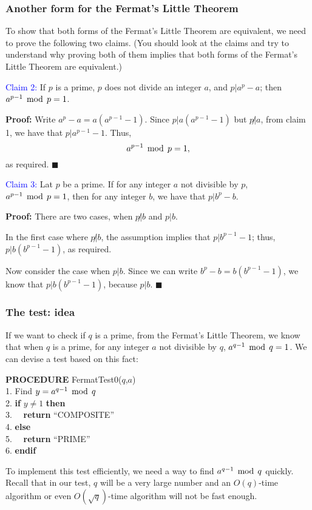 \begin{frame}\frametitle{Another form for the Fermat's Little Theorem}
  To show that both forms of the Fermat's Little Theorem are
  equivalent, we need to prove the following two claims.  (You should
  look at the claims and try to understand why proving both of them
  implies that both forms of the Fermat's Little Theorem are
  equivalent.)

  \begin{tcolorbox}[title=Second form $\Rightarrow$ first form]
    \textcolor{blue}{Claim 2:} If $p$ is a prime, $p$ does not divide an integer $a$, and $p|a^p-a$; then $a^{p-1}\,\bmod\, p = 1$.
  \end{tcolorbox}

  {\bf Proof:} Write $a^p-a = a(a^{p-1}-1)$.  Since $p|a(a^{p-1}-1)$
  but $p\not|a$, from claim 1, we have that $p|a^{p-1}-1$.  Thus, 
  \[ a^{p-1}\,\bmod\, p = 1, \]
  as required. $\blacksquare$
\end{frame}

\begin{frame} 
  \begin{tcolorbox}[title=First form $\Rightarrow$ second form]
    \textcolor{blue}{Claim 3:} Lat $p$ be a prime.  If for any integer
    $a$ not divisible by $p$, $a^{p-1}\,\bmod\, p = 1$, then for any
    integer $b$, we have that $p|b^p-b$.
  \end{tcolorbox}
  
  {\bf Proof:} There are two cases, when $p\not|b$ and $p|b$.  

  In the first case where $p\not|b$, the assumption implies that
  $p|b^{p-1}-1$; thus, $p|b(b^{p-1}-1)$, as required.

  Now consider the case when $p|b$.  Since we can write
  $b^p-b=b(b^{p-1}-1)$, we know that $p|b(b^{p-1}-1)$, because
  $p|b$. $\blacksquare$
\end{frame}

\begin{frame}\frametitle{The test: idea}
  If we want to check if $q$ is a prime, from the Fermat's Little
  Theorem, we know that when $q$ is a prime, for any integer $a$ not
  divisible by $q$, $a^{q-1}\,\bmod\, q=1$.  We can devise a test based on
  this fact:

  \begin{tcolorbox}
    {\bf PROCEDURE} FermatTest0($q$,$a$)\\
    1. Find $y = a^{q-1}\,\bmod\, q$\\
    2. {\bf if} $y\neq 1$ {\bf then}\\
    3. \ \ {\bf return} ``COMPOSITE''\\
    4. {\bf else}\\
    5. \ \ {\bf return} ``PRIME''\\
    6. {\bf endif}
  \end{tcolorbox}

  To implement this test efficiently, we need a way to find
  $a^{q-1}\,\bmod\, q$ quickly.  Recall that in our test, $q$ will be a
  very large number and an $O(q)$-time algorithm or even
  $O(\sqrt{q})$-time algorithm will not be fast enough.
\end{frame}

